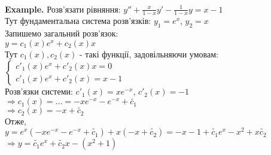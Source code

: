 \documentclass[a4paper, 14pt]{extarticle}
\def\huge{\displaystyle}
\def\bigline{\vspace{5mm}\\}
\begin{document}
\bigline
\textbf{Example.} Розв'язати рівняння: $\huge y'' + \frac{x}{1-x}y' - \frac{1}{1-x}y = x-1$\\
Тут фундаментальна система розв'язків: $y_1 = e^x$, $y_2 = x$\\
Запишемо загальний розв'язок:\\
$y = c_1(x)e^x +c_2(x)x$\\
Тут $c_1(x), c_2(x)$ - такі функції, задовільняючи умовам:\\
$\begin{cases}
c'_1(x)e^x + c'_2(x)x = 0\\
c'_1(x)e^x + c'_2(x) = x-1
\end{cases}$\\
Розв'язки системи: $c'_1(x) = xe^{-x}$, $c'_2(x) = -1$\\
$\Rightarrow c_1(x) = \dots = -xe^{-x} -e^{-x} + \tilde{c_1}$\\
$\Rightarrow c_2(x) = -x + \tilde{c_2}$\\
Отже,\\
$y = e^x(-xe^{-x}-e^{-x}+\tilde{c_1}) + x(-x+\tilde{c_2}) = -x - 1 + \tilde{c_1}e^x - x^2 + x \tilde{c_2}$\\
$\Rightarrow y = \tilde{c_1}e^{x} + \tilde{c_2}x - (x^2 + 1)$
\end{document}
